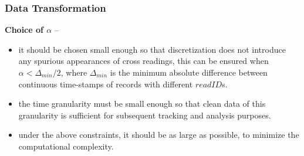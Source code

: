 \begin{frame}
\frametitle{Data Transformation}

\textbf{Choice of $\alpha$} --
\begin{itemize}
  \item it should be chosen small enough so that discretization does not introduce any spurious appearances of cross readings, this can be ensured when $\alpha < \Delta_{min} / 2$, where $\Delta_{min}$ is the minimum absolute difference between continuous time-stamps of records with different $readID$s.
  \item the time granularity must be small enough so that clean data of this granularity is sufficient for subsequent tracking and analysis purposes.
  \item under the above constraints, it should be as large as possible, to minimize the computational complexity.
\end{itemize}

\end{frame}


